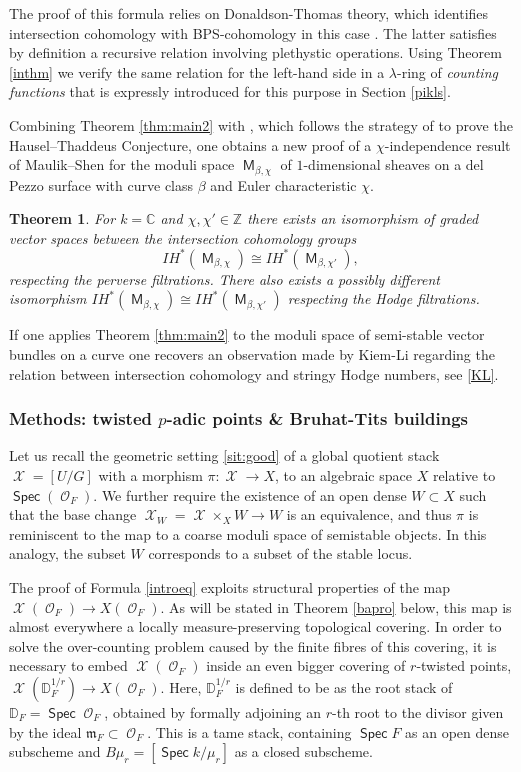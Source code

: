 \documentclass{article}
\DeclareMathOperator{\Xc}{\mathcal{X}}
\DeclareMathOperator{\Oc}{\mathcal{O}}
\DeclareMathOperator{\M}{{\mathsf{M}}}
\DeclareMathOperator{\Spec}{\mathsf{Spec}}
\newcommand{\BC}{{\mathbb{C}}}
\newcommand{\BZ}{{\mathbb{Z}}}
\newcommand{\Dr}[1][r]{\mathbb{D}_F^{1/#1}}
\theoremstyle{definition}
\theoremstyle{plain}
\newtheorem{theorem}[definition]{Theorem}
\begin{document}
The proof of this formula relies on Donaldson-Thomas theory, which identifies intersection cohomology with BPS-cohomology in this case \cite{Me15,DM20}. The latter satisfies by definition a recursive relation involving plethystic operations. Using Theorem \ref{inthm} we verify the same relation for the left-hand side in a $\lambda$-ring of \emph{counting functions} that is expressly introduced for this purpose in Section \ref{pikls}. 


Combining Theorem \ref{thm:main2} with \cite{COW21}, which follows the strategy of \cite{GWZ20a} to prove the Hausel--Thaddeus Conjecture, one obtains a new proof of a $\chi$-independence result of Maulik--Shen for the moduli space $\M_{\beta,\chi}$ of $1$-dimensional sheaves on a del Pezzo surface with curve class $\beta$ and Euler characteristic $\chi$. 

\begin{theorem}\cite[Theorem 0.1]{MS20} \label{thm:intro-chi}For $k= \BC$ and $\chi,\chi' \in \BZ$ there exists an isomorphism of graded vector spaces between the intersection cohomology groups
\[ IH^*(\M_{\beta,\chi}) \cong IH^*(\M_{\beta,\chi'}),  \]
respecting the perverse filtrations. There also exists a possibly different isomorphism $IH^*(\M_{\beta,\chi}) \cong IH^*(\M_{\beta,\chi'})$ respecting the Hodge filtrations.  
\end{theorem}

If one applies Theorem \ref{thm:main2} to the moduli space of semi-stable vector bundles on a curve one recovers an observation made by Kiem-Li \cite{KL04} regarding the relation between intersection cohomology and stringy Hodge numbers, see \ref{KL}. 


\subsubsection*{Methods: twisted $p$-adic points \& Bruhat-Tits buildings}

Let us recall the geometric setting \ref{sit:good} of a global quotient stack $\Xc = [U/G]$ with a morphism 
$\pi: \Xc \to X$,
to an algebraic space $X$ relative to $\Spec(\Oc_F)$. We further require the existence of an open dense $W \subset X$ such that the base change $\Xc_W = \Xc \times_X W \to W$ is an equivalence, and thus $\pi$ is reminiscent to the map to a coarse moduli space of semistable objects. In this analogy, the subset $W$ corresponds to a subset of the stable locus.

The proof of Formula \eqref{introeq} exploits structural properties of the map $\Xc(\Oc_F) \to X(\Oc_F)$. As will be stated in Theorem \ref{bapro} below, this map is almost everywhere a locally measure-preserving topological covering. In order to solve the over-counting problem caused by the finite fibres of this covering, it is necessary to embed $\Xc(\Oc_F)$ inside an even bigger covering of $r$-twisted points, $\Xc(\Dr) \to X(\Oc_F)$. Here, $\Dr$ is defined to be as the root stack of $\mathbb{D}_F=\Spec \Oc_F$, obtained by formally adjoining an $r$-th root to the divisor given by the ideal $\mathfrak{m}_F \subset \Oc_F$. This is a tame stack, containing $\Spec F$ as an open dense subscheme and $B\mu_r = [\Spec k / \mu_r]$ as a closed subscheme.
\end{document}
